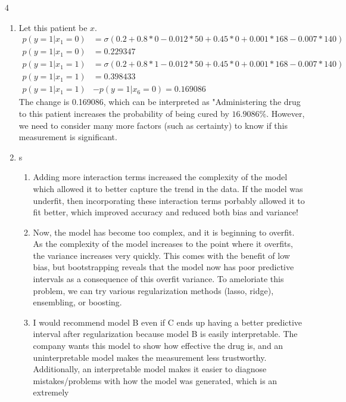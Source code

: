 \documentclass[submit]{harvardml}
\begin{document}
\newpage
\begin{sol}{}{4}
  \begin{enumerate}
    \item Let this patient be $x$.
    \begin{align*}
      p(y = 1|x_1 = 0) &= \sigma(0.2 + 0.8*0 - 0.012*50+0.45*0+0.001*168-0.007*140)\\
      p(y = 1|x_1 = 0) &= 0.229347\\
      p(y = 1|x_1 = 1) &= \sigma(0.2 + 0.8*1 - 0.012*50+0.45*0+0.001*168-0.007*140)\\
      p(y = 1|x_1 = 1) &= 0.398433\\
      p(y = 1|x_1 = 1) &- p(y = 1|x_6 = 0) = 0.169086
    \end{align*}
    The change is 0.169086, which can be interpreted as "Administering the drug to this patient
    increases the probability of being cured by $16.9086\%$. However, we need to consider
    many more factors (such as certainty) to know if this measurement is significant.
  \item s
  \begin{enumerate}
    \item Adding more interaction terms increased the complexity of the model which
    allowed it to better capture the trend in the data. If the model was underfit, then
    incorporating these interaction terms porbably allowed it to fit better, which improved accuracy
    and reduced both bias and variance!
    \item Now, the model has become too complex, and it is beginning to overfit.
    As the complexity of the model increases to the point where it overfits,
    the variance increases very quickly. This comes with the benefit of low bias,
    but bootstrapping reveals that the model now has poor predictive intervals as
    a consequence of this overfit variance. To ameloriate this problem, we can
    try various regularization methods (lasso, ridge), ensembling, or boosting.
    \item I would recommend model B even if C ends up having a better predictive interval
    after regularization because model B is easily interpretable. The company wants this model
    to show how effective the drug is, and an uninterpretable model makes the measurement
    less trustworthy. Additionally, an interpretable model makes it easier to
    diagnose mistakes/problems with how the model was generated, which is an extremely 

\end{enumerate}
\end{enumerate}
\end{sol}
\end{document}
